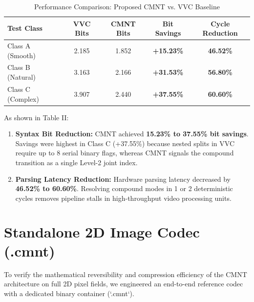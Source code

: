 \documentclass[conference]{IEEEtran}
\begin{document}
\begin{table}[htbp]
\caption{Performance Comparison: Proposed CMNT vs. VVC Baseline}
\begin{center}
\begin{tabular}{lcccc}
\toprule
\textbf{Test Class} & \textbf{VVC Bits} & \textbf{CMNT Bits} & \textbf{Bit Savings} & \textbf{Cycle Reduction} \\
\midrule
Class A (Smooth)   & 2.185 & 1.852 & \textbf{+15.23\%} & \textbf{46.52\%} \\
Class B (Natural)  & 3.163 & 2.166 & \textbf{+31.53\%} & \textbf{56.80\%} \\
Class C (Complex)  & 3.907 & 2.440 & \textbf{+37.55\%} & \textbf{60.60\%} \\
\bottomrule
\end{tabular}
\end{center}
\end{table}

As shown in Table II:
\begin{enumerate}
    \item \textbf{Syntax Bit Reduction:} CMNT achieved \textbf{15.23\% to 37.55\% bit savings}. Savings were highest in Class C (+37.55\%) because nested splits in VVC require up to 8 serial binary flags, whereas CMNT signals the compound transition as a single Level-2 joint index.
    \item \textbf{Parsing Latency Reduction:} Hardware parsing latency decreased by \textbf{46.52\% to 60.60\%}. Resolving compound modes in 1 or 2 deterministic cycles removes pipeline stalls in high-throughput video processing units.
\end{enumerate}

\section{Standalone 2D Image Codec (.cmnt)}
To verify the mathematical reversibility and compression efficiency of the CMNT architecture on full 2D pixel fields, we engineered an end-to-end reference codec with a dedicated binary container (`.cmnt`).
\end{document}
